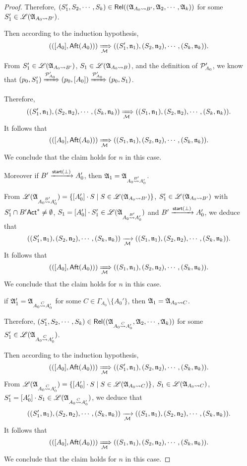 \begin{proof}
{Therefore, $(S'_1, S_2, \cdots, S_k) \in \mathsf{Rel}(({\mathfrak{A} }_{A_0\rightsquigarrow B'}, {\mathfrak{A} }_2, \cdots, {\mathfrak{A} }_k))$ for some $S'_1 \in {\mathscr{L} }({\mathfrak{A} }_{A_0\rightsquigarrow B'})$. 

Then according to the induction hypothesis, 
$$(([A_0], {\sf Aft}(A_0))) \xRightarrow[{\mathcal{M} }]{} ((S'_1, \mathfrak{n}_1), (S_2, \mathfrak{n}_2), \cdots, (S_k, \mathfrak{n}_k)).$$

From $S'_1 \in {\mathscr{L} }({\mathfrak{A} }_{A_0\rightsquigarrow B'})$, $S_1 \in {\mathscr{L} }({\mathfrak{A} }_{A_0\rightsquigarrow B})$, and the definition of ${\mathcal{P} }'_{A_0}$, we know that $(p_0, S'_1) \xRightarrow{{\mathcal{P} }'_{A_0}} (p_0, [A_0]) \xRightarrow{{\mathcal{P} }'_{A_0}} (p_0, S_1)$. 

Therefore, 
$$((S'_1, \mathfrak{n}_1), (S_2, \mathfrak{n}_2), \cdots, (S_k, \mathfrak{n}_k)) \xRightarrow[{\mathcal{M} }]{} ((S_1, \mathfrak{n}_1), (S_2, \mathfrak{n}_2), \cdots, (S_k, \mathfrak{n}_k)).$$
It follows that 
$$(([A_0], {\sf Aft}(A_0))) \xRightarrow[{\mathcal{M} }]{} ((S_1, \mathfrak{n}_1), (S_2, \mathfrak{n}_2), \cdots, (S_k, \mathfrak{n}_k)).$$
We conclude that the claim holds for $n$ in this case. 

Moreover if $B'\xrightarrow{{\mathsf{start} }(\bot)}A_0'$, then ${\mathfrak{A} }_1 = {\mathfrak{A} }_{A_0\stackrel{B'}\rightsquigarrow A_0'}$.

From ${\mathscr{L} }({\mathfrak{A} }_{A_0\stackrel{B'}\rightsquigarrow A_0'}) = \{[A_0']\cdot S\mid S \in {\mathscr{L} }({\mathfrak{A} }_{A_0\rightsquigarrow B'})\}$, $S'_1 \in {\mathscr{L} }({\mathfrak{A} }_{A_0\rightsquigarrow B'})$ with $S'_1\cap B'{\sf Act}^* \neq \emptyset$, $S_1 = [A_0']\cdot S'_1 \in {\mathscr{L} }({\mathfrak{A} }_{A_0\stackrel{B'}\rightsquigarrow A_0'})$ and $B'\xrightarrow{{\mathsf{start} }(\bot)}A_0'$, we deduce that
$$((S'_1, \mathfrak{n}_1), (S_2, \mathfrak{n}_2), \cdots, (S_k, \mathfrak{n}_k)) \xrightarrow[{\mathcal{M} }]{} ((S_1, \mathfrak{n}_1), (S_2, \mathfrak{n}_2), \cdots, (S_k, \mathfrak{n}_k)).$$
It follows that 
$$(([A_0], {\sf Aft}(A_0))) \xRightarrow[{\mathcal{M} }]{} ((S_1, \mathfrak{n}_1), (S_2, \mathfrak{n}_2), \cdots, (S_k, \mathfrak{n}_k)).$$
We conclude that the claim holds for $n$ in this case. 
    \item if ${\mathfrak{A} }_1' = {\mathfrak{A} }_{A_0\stackrel{C}\rightsquigarrow A_0'}$ for some $C\in\Gamma_{A_0}\setminus\{A_0'\}$, then ${\mathfrak{A} }_1 = {\mathfrak{A} }_{A_0\rightsquigarrow C}$.

Therefore, $(S'_1, S_2, \cdots, S_k) \in \mathsf{Rel}(({\mathfrak{A} }_{A_0\stackrel{C}\rightsquigarrow A_0'}, {\mathfrak{A} }_2, \cdots, {\mathfrak{A} }_k))$ for some $S'_1 \in {\mathscr{L} }({\mathfrak{A} }_{A_0\stackrel{C}\rightsquigarrow A_0'})$. 

Then according to the induction hypothesis, 
$$(([A_0], {\sf Aft}(A_0))) \xRightarrow[{\mathcal{M} }]{} ((S'_1, \mathfrak{n}_1), (S_2, \mathfrak{n}_2), \cdots, (S_k, \mathfrak{n}_k)).$$
From ${\mathscr{L} }({\mathfrak{A} }_{A_0\stackrel{C}\rightsquigarrow A_0'}) = \{[A_0']\cdot S\mid S \in {\mathscr{L} }({\mathfrak{A} }_{A_0\rightsquigarrow C})\}$,  $S_1\in{\mathscr{L} }({\mathfrak{A} }_{A_0\rightsquigarrow C})$, $S'_1 = [A_0']\cdot S_1\in{\mathscr{L} }({\mathfrak{A} }_{A_0\stackrel{C}\rightsquigarrow A_0'})$, we deduce that
$$((S'_1, \mathfrak{n}_1), (S_2, \mathfrak{n}_2), \cdots, (S_k, \mathfrak{n}_k)) \xrightarrow[{\mathcal{M} }]{} ((S_1, \mathfrak{n}_1), (S_2, \mathfrak{n}_2), \cdots, (S_k, \mathfrak{n}_k)).$$
It follows that 
$$(([A_0], {\sf Aft}(A_0))) \xRightarrow[{\mathcal{M} }]{} ((S_1, \mathfrak{n}_1), (S_2, \mathfrak{n}_2), \cdots, (S_k, \mathfrak{n}_k)).$$
We conclude that the claim holds for $n$ in this case. 

}
\end{proof}
